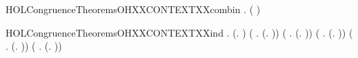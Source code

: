 \newcommand{\HOLCongruenceTheoremsOHXXCONTEXTXXcases}{\UseVerbatim{HOLCongruenceTheoremsOHXXCONTEXTXXcases}}
\begin{SaveVerbatim}{HOLCongruenceTheoremsOHXXCONTEXTXXcombin}
\HOLTokenTurnstile{} \HOLSymConst{\HOLTokenForall{}} .   \HOLSymConst{\HOLTokenConj{}}   \HOLSymConst{\HOLTokenImp{}}  ( \HOLConst{\HOLTokenCompose} )
\end{SaveVerbatim}
\newcommand{\HOLCongruenceTheoremsOHXXCONTEXTXXcombin}{\UseVerbatim{HOLCongruenceTheoremsOHXXCONTEXTXXcombin}}
\begin{SaveVerbatim}{HOLCongruenceTheoremsOHXXCONTEXTXXind}
\HOLTokenTurnstile{} \HOLSymConst{\HOLTokenForall{}}.
        (\HOLTokenLambda{}. ) \HOLSymConst{\HOLTokenConj{}}
       (\HOLSymConst{\HOLTokenForall{}} .   \HOLSymConst{\HOLTokenImp{}}  (\HOLTokenLambda{}.  )) \HOLSymConst{\HOLTokenConj{}}
       (\HOLSymConst{\HOLTokenForall{}} .   \HOLSymConst{\HOLTokenImp{}}  (\HOLTokenLambda{}.   \HOLSymConst{+} )) \HOLSymConst{\HOLTokenConj{}}
       (\HOLSymConst{\HOLTokenForall{}} .   \HOLSymConst{\HOLTokenImp{}}  (\HOLTokenLambda{}.  \HOLSymConst{+}  )) \HOLSymConst{\HOLTokenConj{}}
       (\HOLSymConst{\HOLTokenForall{}} .   \HOLSymConst{\HOLTokenImp{}}  (\HOLTokenLambda{}.   \HOLSymConst{\ensuremath{\parallel}} )) \HOLSymConst{\HOLTokenConj{}}
       (\HOLSymConst{\HOLTokenForall{}} .   \HOLSymConst{\HOLTokenImp{}}  (\HOLTokenLambda{}.  \HOLSymConst{\ensuremath{\parallel}}  )) \HOLSymConst{\HOLTokenConj{}}

\end{SaveVerbatim}
